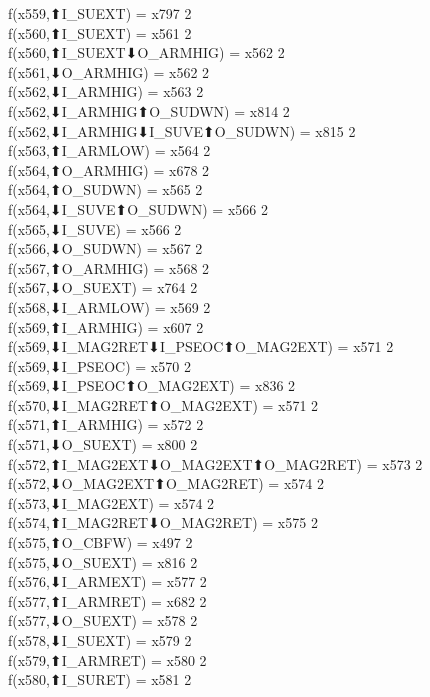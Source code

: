 f(x559,⬆I_SUEXT) = x797 {2} \\
f(x560,⬆I_SUEXT) = x561 {2} \\
f(x560,⬆I_SUEXT⬇O_ARMHIG) = x562 {2} \\
f(x561,⬇O_ARMHIG) = x562 {2} \\
f(x562,⬇I_ARMHIG) = x563 {2} \\
f(x562,⬇I_ARMHIG⬆O_SUDWN) = x814 {2} \\
f(x562,⬇I_ARMHIG⬇I_SUVE⬆O_SUDWN) = x815 {2} \\
f(x563,⬆I_ARMLOW) = x564 {2} \\
f(x564,⬆O_ARMHIG) = x678 {2} \\
f(x564,⬆O_SUDWN) = x565 {2} \\
f(x564,⬇I_SUVE⬆O_SUDWN) = x566 {2} \\
f(x565,⬇I_SUVE) = x566 {2} \\
f(x566,⬇O_SUDWN) = x567 {2} \\
f(x567,⬆O_ARMHIG) = x568 {2} \\
f(x567,⬇O_SUEXT) = x764 {2} \\
f(x568,⬇I_ARMLOW) = x569 {2} \\
f(x569,⬆I_ARMHIG) = x607 {2} \\
f(x569,⬇I_MAG2RET⬇I_PSEOC⬆O_MAG2EXT) = x571 {2} \\
f(x569,⬇I_PSEOC) = x570 {2} \\
f(x569,⬇I_PSEOC⬆O_MAG2EXT) = x836 {2} \\
f(x570,⬇I_MAG2RET⬆O_MAG2EXT) = x571 {2} \\
f(x571,⬆I_ARMHIG) = x572 {2} \\
f(x571,⬇O_SUEXT) = x800 {2} \\
f(x572,⬆I_MAG2EXT⬇O_MAG2EXT⬆O_MAG2RET) = x573 {2} \\
f(x572,⬇O_MAG2EXT⬆O_MAG2RET) = x574 {2} \\
f(x573,⬇I_MAG2EXT) = x574 {2} \\
f(x574,⬆I_MAG2RET⬇O_MAG2RET) = x575 {2} \\
f(x575,⬆O_CBFW) = x497 {2} \\
f(x575,⬇O_SUEXT) = x816 {2} \\
f(x576,⬇I_ARMEXT) = x577 {2} \\
f(x577,⬆I_ARMRET) = x682 {2} \\
f(x577,⬇O_SUEXT) = x578 {2} \\
f(x578,⬇I_SUEXT) = x579 {2} \\
f(x579,⬆I_ARMRET) = x580 {2} \\
f(x580,⬆I_SURET) = x581 {2} \\
